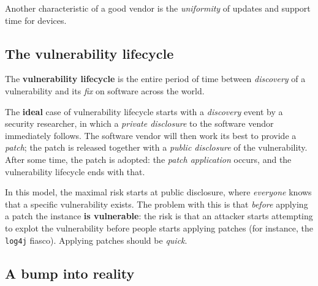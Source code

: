 \documentclass[10pt]{extbook}
\begin{document}
Another characteristic of a good vendor is the \emph{uniformity} of updates and
support time for devices.


\subsection{The vulnerability lifecycle}

The \textbf{vulnerability lifecycle} is the entire period of time between
\emph{discovery} of a vulnerability and its \emph{fix} on software across the
world.

The \textbf{ideal} case of vulnerability lifecycle starts with a
\emph{discovery} event by a security researcher, in which a \emph{private
disclosure} to the software vendor immediately follows. The software vendor
will then work its best to provide a \emph{patch}; the patch is released
together with a \emph{public disclosure} of the vulnerability. After some time,
the patch is adopted: the \emph{patch application} occurs, and the
vulnerability lifecycle ends with that.

In this model, the maximal risk starts at public disclosure, where
\emph{everyone} knows that a specific vulnerability exists. The problem with
this is that \emph{before} applying a patch the instance \textbf{is
vulnerable}: the risk is that an attacker starts attempting to explot the
vulnerability before people starts applying patches (for instance, the
\texttt{log4j} fiasco). Applying patches should be \emph{quick}.

\subsection{A bump into reality}
\end{document}
